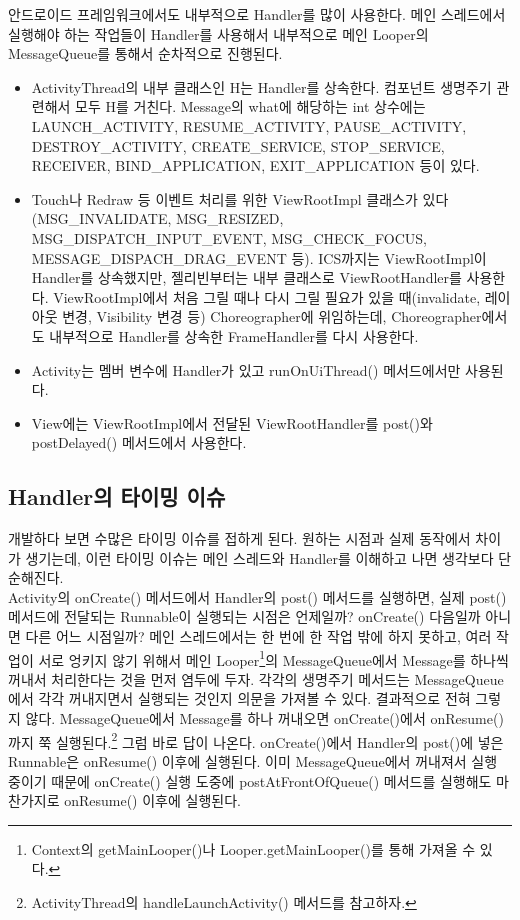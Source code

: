 안드로이드 프레임워크에서도 내부적으로 Handler를 많이 사용한다. 
메인 스레드에서 실행해야 하는 작업들이 Handler를 사용해서 내부적으로 메인 Looper의 MessageQueue를 통해서 순차적으로 진행된다.
\begin{itemize}
\item ActivityThread의 내부 클래스인 H는 Handler를 상속한다. 
컴포넌트 생명주기 관련해서 모두 H를 거친다. Message의 what에 해당하는 int 상수에는 LAUNCH\_ACTIVITY, RESUME\_ACTIVITY, PAUSE\_ACTIVITY, DESTROY\_ACTIVITY, CREATE\_SERVICE, STO\-P\_SERVICE, RECEI\-VER, BIND\_APPLICATION, EXIT\_APPLICATION 등이 있다.

\item Touch나 Redraw 등 이벤트 처리를 위한 ViewRootImpl 클래스가 있다(MSG\_INVALIDATE, MSG\_R\-E\-SIZED, MSG\_DISPATCH\_INPUT\_EVENT, MSG\_CHECK\_FOCUS, MESS\-AGE\_DISPACH\-\_DRAG\_EV\-ENT 등).
ICS까지는 ViewRootImpl이 Handler를 상속했지만, 젤리빈부터는 내부 클래스로 ViewRootHandler를 사용한다.
ViewRootImpl에서 처음 그릴 때나 다시 그릴 필요가 있을 때(invalidate, 레이아웃 변경, Visibility 변경 등) Choreographer에 위임하는데, Choreographer에서도 내부적으로 Handler를 상속한 FrameHandler를 다시 사용한다.

\item Activity는 멤버 변수에 Handler가 있고 runOnUiThread() 메서드에서만 사용된다. 

\item View에는 ViewRootImpl에서 전달된 ViewRootHandler를 post()와 postDelayed() 메서드에서 사용한다.
\end{itemize}

\subsection{Handler의 타이밍 이슈}
개발하다 보면 수많은 타이밍 이슈를 접하게 된다. 원하는 시점과 실제 동작에서 차이가 생기는데, 이런 타이밍 이슈는 메인 스레드와 Handler를 이해하고 나면 생각보다 단순해진다.\\

Activity의 onCreate() 메서드에서 Handler의 post() 메서드를 실행하면, 실제 post() 메서드에 전달되는 Runnable이 실행되는 시점은 언제일까? 
onCreate() 다음일까 아니면 다른 어느 시점일까?
메인 스레드에서는 한 번에 한 작업 밖에 하지 못하고, 여러 작업이 서로 엉키지 않기 위해서 메인 Looper\footnote{Context의 getMainLooper()나 Looper.getMainLooper()를 통해 가져올 수 있다.}의 MessageQueue에서 Message를 하나씩 꺼내서 처리한다는 것을 먼저 염두에 두자.
각각의 생명주기 메서드는 MessageQueue에서 각각 꺼내지면서 실행되는 것인지 의문을 가져볼 수 있다. 결과적으로 전혀 그렇지 않다.
MessageQueue에서 Message를 하나 꺼내오면 onCreate()에서 onResume()까지 쭉 실행된다.\footnote{ActivityThread의 handleLaunchActivity() 메서드를 참고하자.} 그럼 바로 답이 나온다. 
onCreate()에서 Handler의 post()에 넣은 Runnable은 onResume() 이후에 실행된다.
이미 MessageQueue에서 꺼내져서 실행 중이기 때문에 onCreate() 실행 도중에 postAtFrontOfQueue() 메서드를 실행해도 마찬가지로 onResume() 이후에 실행된다.\\

